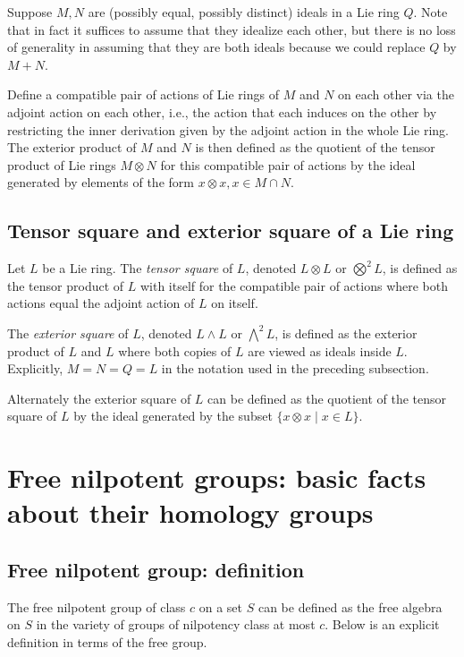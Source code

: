 Suppose $M,N$ are (possibly equal, possibly distinct) ideals in a Lie
ring $Q$. Note that in fact it suffices to assume that they idealize
each other, but there is no loss of generality in assuming that they
are both ideals because we could replace $Q$ by $M + N$. 

Define a compatible pair of actions of Lie rings of $M$ and $N$ on
each other via the adjoint action on each other, i.e., the action that
each induces on the other by restricting the inner derivation given by
the adjoint action in the whole Lie ring. The exterior product of $M$ and
$N$ is then defined as the quotient of the tensor product of Lie rings
$M \otimes N$ for this compatible pair of actions by the ideal
generated by elements of the form $x \otimes x, x \in M \cap N$.

\subsection{Tensor square and exterior square of a Lie ring}

Let $L$ be a Lie ring. The {\em tensor square} of $L$, denoted $L \otimes
L$ or $\bigotimes^2L$, is defined as the tensor product of $L$ with
itself for the compatible pair of actions where both actions equal the
adjoint action of $L$ on itself.

The {\em exterior square} of $L$, denoted $L \wedge L$ or
$\bigwedge^2L$, is defined as the exterior product of $L$ and $L$
where both copies of $L$ are viewed as ideals inside $L$. Explicitly,
$M = N = Q = L$ in the notation used in the preceding subsection.

Alternately the exterior square of $L$ can be defined as the quotient
of the tensor square of $L$ by the ideal generated by the
subset $\{ x \otimes x \mid x \in L \}$.


\section{Free nilpotent groups: basic facts about their homology groups}\label{sec:free-nilpotent-groups-homology}

\subsection{Free nilpotent group: definition}

The free nilpotent group of class $c$ on a set $S$ can be defined as
the free algebra on $S$ in the variety of groups of nilpotency class
at most $c$. Below is an explicit definition in terms of the free
group.

